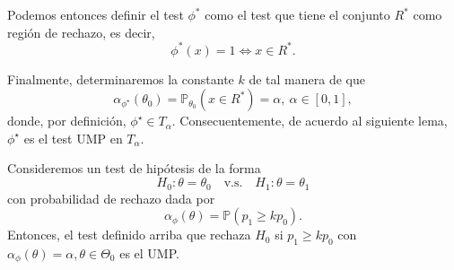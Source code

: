 Podemos entonces definir el test $\phi^*$ como el test que tiene el conjunto $R^*$ como región de rechazo, es decir, 
\begin{equation}
	\phi^*(x) = 1 \Leftrightarrow x\in R^*.
\end{equation}

Finalmente, determinaremos la constante $k$ de tal manera de que 
\begin{equation}
	\alpha_{\phi^\star}(\theta_0) = \mathbb{P}_{\theta_0}(x\in R^*) = \alpha,\ \alpha\in[0,1], 
\end{equation}
donde, por definición, $\phi^\star\in T_\alpha$. Consecuentemente, de acuerdo al siguiente lema, $\phi^\star$ es el test UMP en $T_\alpha$.

\begin{lemma}
	Consideremos un test de hipótesis de la forma 
	\begin{equation}
		H_0:\theta =\theta_0\quad \text{v.s.}\quad H_1:\theta = \theta_1
	\end{equation}
	con probabilidad de rechazo dada por
	\begin{equation}
			\alpha_\phi(\theta) = \mathbb{P}(p_1\geq k p_0).
		\end{equation}
	Entonces, el test definido arriba que rechaza $H_0$ si $p_1\geq k p_0$ con $\alpha_\phi(\theta) = \alpha,\theta\in\Theta_0$ es el UMP.
\end{lemma}

